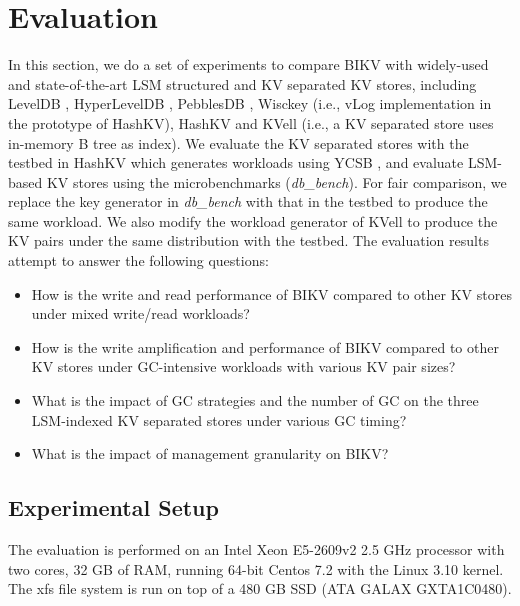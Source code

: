 \documentclass[sigconf]{acmart}
\begin{document}
\section{Evaluation} \label{sec4}
In this section, we do a set of experiments to compare BIKV with widely-used and state-of-the-art LSM structured and KV separated KV stores, including LevelDB \cite{LevelDB}, HyperLevelDB \cite{HyperLevelDB}, PebblesDB \cite{PebblesDB}, Wisckey \cite{Wisckey} (i.e., vLog implementation in the prototype of HashKV), HashKV \cite{HashKV} and KVell \cite{KVell} (i.e., a KV separated store uses in-memory B tree as index). We evaluate the KV separated stores with the testbed in HashKV which generates workloads using YCSB \cite{YCSB}, and evaluate LSM-based KV stores using the microbenchmarks (\textit{db\_bench}). For fair comparison, we replace the key generator in \textit{db\_bench} with that in the testbed to produce the same workload. We also modify the workload generator of KVell to produce the KV pairs under the same distribution with the testbed. The evaluation results attempt to answer the following questions:
\begin{itemize}
	\item How is the write and read performance of BIKV compared to other KV stores under mixed write/read workloads?
	\item How is the write amplification and performance of BIKV compared to other KV stores under GC-intensive workloads with various KV pair sizes?
	\item What is the impact of GC strategies and the number of GC on the three LSM-indexed KV separated stores under various GC timing?  
	\item What is the impact of management granularity on BIKV?
\end{itemize}

\subsection{Experimental Setup}
The evaluation is performed on an Intel Xeon E5-2609v2 2.5 GHz processor with two cores, 32 GB of RAM, running 64-bit Centos 7.2 with the Linux 3.10 kernel. The xfs file system is run on top of a 480 GB SSD (ATA GALAX GXTA1C0480). 
\end{document}
